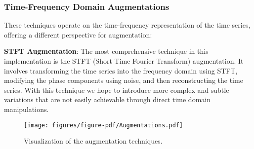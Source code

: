 \subsubsection*{Time-Frequency Domain Augmentations}
These techniques operate on the time-frequency representation of the time series, offering a different perspective for augmentation:

\textbf{STFT Augmentation}: The most comprehensive technique in this implementation is the STFT (Short Time Fourier Transform) augmentation. It involves transforming the time series into the frequency domain using STFT, modifying the phase components using noise, and then reconstructing the time series. With this technique we hope to introduce more complex and subtle variations that are not easily achievable through direct time domain manipulations.

\begin{figure}
    \centering
    \texttt{[image: figures/figure-pdf/Augmentations.pdf]}
    \caption{Visualization of the augmentation techniques.}
\end{figure}
